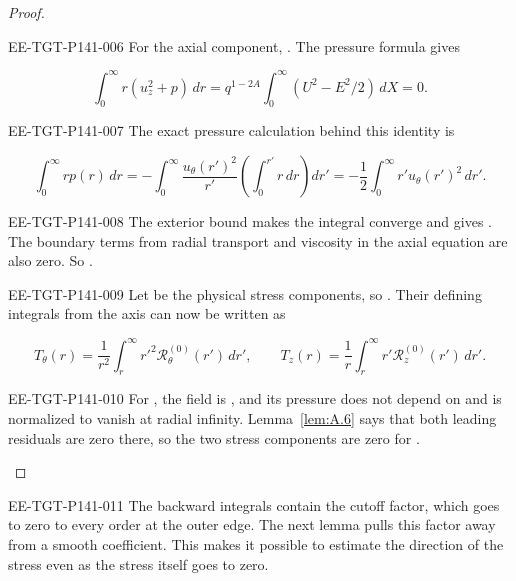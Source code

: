 \begin{proof}
\begin{EESegment}{EE-TGT-P141-006}
For the axial component, . The pressure formula
 gives
\end{EESegment}
\[
  \int_0^\infty r(u_z^2+p)\,dr
  =q^{1-2A}\int_0^\infty(U^2-E^2/2)\,dX=0.
\]
\begin{EESegment}{EE-TGT-P141-007}
The exact pressure calculation behind this identity is
\end{EESegment}
\[
  \int_0^\infty rp(r)\,dr
  =-\int_0^\infty\frac{u_\theta(r')^2}{r'}
    \left(\int_0^{r'}r\,dr\right)dr'
  =-\frac12\int_0^\infty r'u_\theta(r')^2\,dr'.
\]
\begin{EESegment}{EE-TGT-P141-008}
The exterior bound  makes the integral converge and gives
. The boundary terms from radial transport and viscosity in the axial equation are also
zero. So .
\end{EESegment}

\begin{EESegment}{EE-TGT-P141-009}
Let  be the physical stress components, so
. Their defining integrals from the axis can now be written as
\end{EESegment}
\begin{equation}
  T_\theta(r)=\frac1{r^2}\int_r^\infty r'^2\mathscr R_\theta^{(0)}(r')\,dr',
  \qquad
  T_z(r)=\frac1r\int_r^\infty r'\mathscr R_z^{(0)}(r')\,dr'.
  \tag{A.46}\label{eq:A.46}
\end{equation}
\begin{EESegment}{EE-TGT-P141-010}
For , the field is
, and its pressure does not depend on
 and is normalized to vanish at radial infinity. Lemma~\ref{lem:A.6} says that both leading
residuals are zero there, so the two stress components are zero for .
\end{EESegment}
\end{proof}

\begin{EESegment}{EE-TGT-P141-011}
The backward integrals contain the cutoff factor, which goes to zero to every order at the outer edge. The next lemma
pulls this factor away from a smooth coefficient. This makes it possible to estimate the direction of the stress even
as the stress itself goes to zero.
\end{EESegment}


